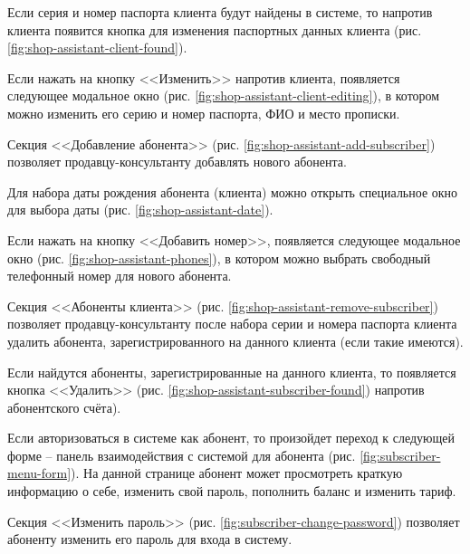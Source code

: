 Если серия и номер паспорта клиента будут найдены в системе, то напротив клиента появится кнопка для изменения паспортных данных клиента (рис. \ref{fig:shop-assistant-client-found}).

Если нажать на кнопку <<Изменить>> напротив клиента, появляется следующее модальное окно (рис. \ref{fig:shop-assistant-client-editing}), в котором можно изменить его серию и номер паспорта, ФИО и место прописки.

Секция <<Добавление абонента>> (рис. \ref{fig:shop-assistant-add-subscriber}) позволяет продавцу-консультанту добавлять нового абонента.

Для набора даты рождения абонента (клиента) можно открыть специальное окно для выбора даты (рис. \ref{fig:shop-assistant-date}).

Если нажать на кнопку <<Добавить номер>>, появляется следующее модальное окно (рис. \ref{fig:shop-assistant-phones}), в котором можно выбрать свободный телефонный номер для нового абонента.

Секция <<Абоненты клиента>> (рис. \ref{fig:shop-assistant-remove-subscriber}) позволяет продавцу-консультанту после набора серии и номера паспорта клиента удалить абонента, зарегистрированного на данного клиента (если такие имеются).

Если найдутся абоненты, зарегистрированные на данного клиента, то появляется кнопка <<Удалить>> (рис. \ref{fig:shop-assistant-subscriber-found}) напротив абонентского счёта).

Если авторизоваться в системе как абонент, то произойдет переход к следующей форме -- панель взаимодействия с системой для абонента (рис. \ref{fig:subscriber-menu-form}). На данной странице абонент может просмотреть краткую информацию о себе, изменить свой пароль, пополнить баланс и изменить тариф.

Секция <<Изменить пароль>> (рис. \ref{fig:subscriber-change-password}) позволяет абоненту изменить его пароль для входа в систему.


